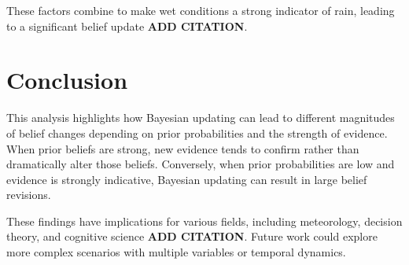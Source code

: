 \documentclass[10pt,a4paper]{article}
\begin{document}
These factors combine to make wet conditions a strong indicator of rain, leading to a significant belief update \textbf{ADD CITATION}.

\section{Conclusion}
This analysis highlights how Bayesian updating can lead to different magnitudes of belief changes depending on prior probabilities and the strength of evidence. When prior beliefs are strong, new evidence tends to confirm rather than dramatically alter those beliefs. Conversely, when prior probabilities are low and evidence is strongly indicative, Bayesian updating can result in large belief revisions.

These findings have implications for various fields, including meteorology, decision theory, and cognitive science \textbf{ADD CITATION}. Future work could explore more complex scenarios with multiple variables or temporal dynamics.
\end{document}
